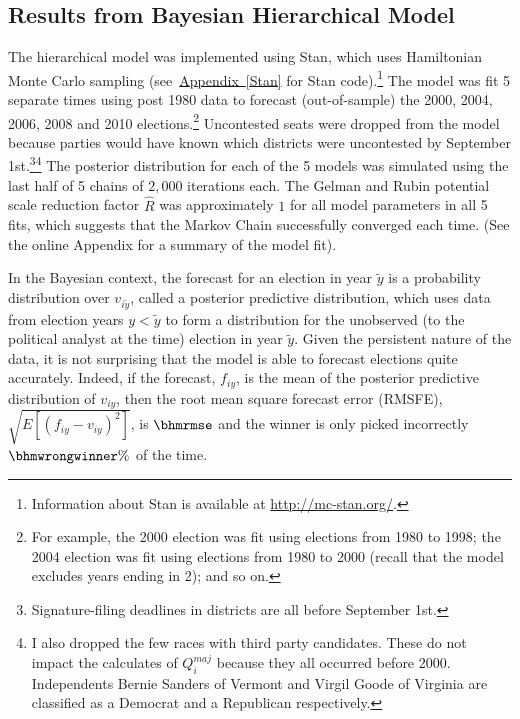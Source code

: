 \documentclass[12pt,final,fleqn]{article}
\newcommand{\aref}[1]{\hyperref[#1]{Appendix~\ref{#1}}}
\theoremstyle{plain}
\begin{document}
\subsection{Results from Bayesian Hierarchical Model} \label{sec: results hierarchical model}
The hierarchical model was implemented using Stan, which uses Hamiltonian Monte Carlo sampling (see~\aref{Stan} for Stan code).\footnote{Information about Stan is available at \url{http://mc-stan.org/}.} The model was fit 5 separate times using post 1980 data to forecast (out-of-sample) the 2000, 2004, 2006, 2008 and 2010 elections.\footnote{For example, the 2000 election was fit using elections from 1980 to 1998; the 2004 election was fit using elections from 1980 to 2000 (recall that the model excludes years ending in 2); and so on.} Uncontested seats were dropped from the model because parties would have known which districts were uncontested by September 1st.\footnote{Signature-filing deadlines in districts are all before September 1st.}\footnote{I also dropped the few races with third party candidates. These do not impact the calculates of $Q_i^{maj}$ because they all occurred before 2000. Independents Bernie Sanders of Vermont and Virgil Goode of Virginia are classified as a Democrat and a Republican respectively. } The posterior distribution for each of the 5 models was simulated using the last half of 5 chains of $2,000$ iterations each. The Gelman and Rubin potential scale reduction factor $\hat{R}$ was approximately $1$ for all model parameters in all 5 fits, which suggests that the Markov Chain successfully converged each time. (See the online Appendix for a summary of the model fit). 

In the Bayesian context, the forecast for an election in year $\tilde{y}$ is a probability distribution over $v_{i\tilde{y}}$, called a posterior predictive distribution, which uses data from election years $y < \tilde{y}$ to form a distribution for the unobserved (to the political analyst at the time) election in year $\tilde{y}$. Given the persistent nature of the data, it is not surprising that the model is able to forecast elections quite accurately. Indeed, if the forecast, $f_{iy}$, is the mean of the posterior predictive distribution of $v_{iy}$, then the root mean square forecast error (RMSFE), $\sqrt{E[(f_{iy} - v_{iy})^2]}$, is $\bhmrmse$ and the winner is only picked incorrectly $\bhmwrongwinner\%$ of the time. 
\end{document}
